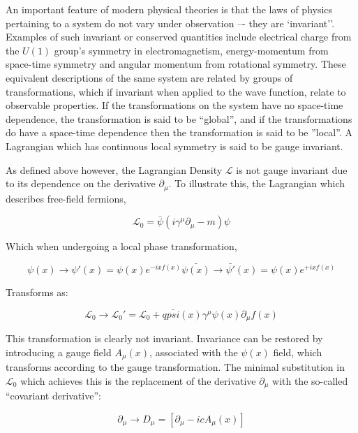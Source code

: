 An important feature of modern physical theories is that the laws of physics pertaining to a system do not vary under observation –- they are `invariant''. 
Examples of such invariant or conserved quantities include electrical charge from the $U(1)$ group’s symmetry in electromagnetism, energy-momentum from space-time symmetry and angular momentum from rotational symmetry\cite{Haywood}. 
These equivalent descriptions of the same system are related by groups of transformations, which if invariant when applied to the wave function, relate to observable properties\cite{QFT}. 
If the transformations on the system have no space-time dependence, the transformation is said to be ``global'', and if the transformations do have a space-time dependence then the transformation is said to be ''local''. 
A Lagrangian which has continuous local symmetry is said to be gauge invariant\cite{Haywood}. 

As defined above however, the Lagrangian Density $\mathcal{L}$ is not gauge invariant due to its dependence on the derivative $\partial _{\mu}$. To illustrate this, the Lagrangian which describes free-field fermions\cite{QFT}, 

\begin{equation}
\mathcal{L}_{0} = \bar{\psi}(i\gamma^{\mu}\partial_{\mu} - m)\psi
\end{equation}

Which when undergoing a local phase transformation,

\begin{equation}
\psi(x) \rightarrow \psi'(x) = \psi(x)e^{-ixf(x)}
\bar{\psi(x)} \rightarrow \bar{\psi'}(x) = \psi(x)e^{+ixf(x)}
\end{equation}

Transforms as:

\begin{equation}
\mathcal{L}_{0} \rightarrow \mathcal{L}_{0}' = \mathcal{L}_{0} + q \bar{psi}(x)\gamma^{\mu}\psi(x)\partial_{\mu}f(x)
\end{equation}

This transformation is clearly not invariant. Invariance can be restored by introducing a gauge field $A_{\mu}(x)$, associated with the $\psi(x)$ field, which transforms according to the gauge transformation. 
The minimal substitution in $\mathcal{L}_{0}$ which achieves this is the replacement of the derivative $\partial_{\mu}$  with the so-called ``covariant derivative''\cite{QFT}:

\begin{equation}
\partial_{\mu} \rightarrow D_{\mu} = [ \partial_{\mu} - icA_{\mu}(x) ]
\end{equation}

